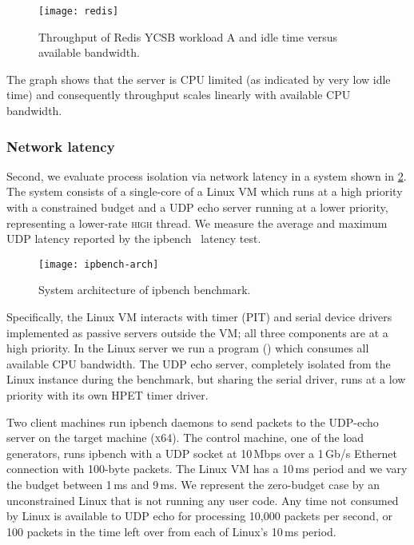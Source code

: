 \begin{figure}[h]
  \centering
  \texttt{[image: redis]}
  \caption{Throughput of Redis YCSB workload A and idle time versus available bandwidth.}
  \label{f:redis}
\end{figure}

The graph shows that the server is CPU limited (as indicated by very low idle time)
and consequently throughput scales linearly with available CPU
bandwidth.

\subsubsection{Network latency}

Second, we evaluate process isolation via network latency in a system shown in \cref{f:ipbench-arch}. 
The system consists of a single-core of a Linux \gls{VM} which runs at a high priority with a
constrained budget and a \gls{UDP} echo server running at a lower priority,
representing a lower-rate \textsc{high} thread. We
measure the average  and maximum UDP latency reported by the
ipbench~\citep{Wienand_Macpherson_04} latency test.

\begin{figure}[h]
    \centering
    \texttt{[image: ipbench-arch]}
    \caption{System architecture of ipbench benchmark.}
    \label{f:ipbench-arch}
\end{figure}


Specifically, the Linux VM interacts with timer (PIT) and serial device drivers implemented as
passive servers outside the \gls{VM}; all three components are at a high priority. In the Linux server we
run a program () which consumes all available
CPU bandwidth.  The UDP echo server, completely isolated from the Linux instance during the
benchmark, but sharing the
serial driver, runs at a low priority with its own HPET timer
driver.

Two client machines run ipbench daemons to send packets to the UDP-echo server on the target machine
(\textsc{x64}). The control machine, one of the load generators, runs ipbench with a \gls{UDP} socket at 10\,Mbps over a 1\,Gb/s Ethernet connection with 100-byte packets. The Linux VM has a 10\,ms period and we vary the
budget between 1\,ms and 9\,ms.
We represent the zero-budget case by an unconstrained Linux that is not running any user code.
Any time not consumed by Linux is available to UDP echo for processing
10,000 packets per second, or 100 packets in the time left over from
each of Linux's 10\,ms period.

